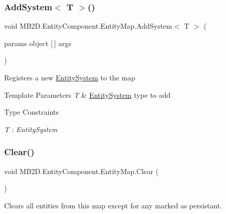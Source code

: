 \subsubsection{\texorpdfstring{Add\+System$<$ T $>$()}{AddSystem< T >()}}
{\footnotesize\ttfamily void M\+B2\+D.\+Entity\+Component.\+Entity\+Map.\+Add\+System$<$ T $>$ (\begin{DoxyParamCaption}\item[{params object \mbox{[}$\,$\mbox{]}}]{args }\end{DoxyParamCaption})\hspace{0.3cm}{\ttfamily [inline]}}



Registers a new \hyperlink{class_m_b2_d_1_1_entity_component_1_1_entity_system}{Entity\+System} to the map 


\begin{DoxyTemplParams}{Template Parameters}
{\em T} & \hyperlink{class_m_b2_d_1_1_entity_component_1_1_entity_system}{Entity\+System} type to add\\
\hline
\end{DoxyTemplParams}
\begin{Desc}
\item[Type Constraints]\begin{description}
\item[{\em T} : {\em Entity\+System}]\end{description}
\end{Desc}
\hypertarget{class_m_b2_d_1_1_entity_component_1_1_entity_map_a079e8e957e7fbaa8de73e609ab646fe1}{}\label{class_m_b2_d_1_1_entity_component_1_1_entity_map_a079e8e957e7fbaa8de73e609ab646fe1} 
\subsubsection{\texorpdfstring{Clear()}{Clear()}}
{\footnotesize\ttfamily void M\+B2\+D.\+Entity\+Component.\+Entity\+Map.\+Clear (\begin{DoxyParamCaption}{ }\end{DoxyParamCaption})\hspace{0.3cm}{\ttfamily [inline]}}



Clears all entities from this map except for any marked as persistant. 

